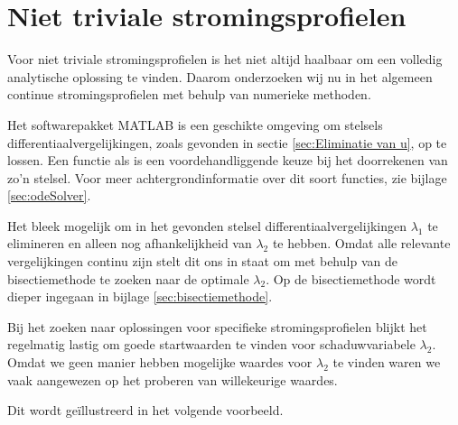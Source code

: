 \chapter{Niet triviale stromingsprofielen}\label{sec:numeriekeMethoden}
Voor niet triviale stromingsprofielen is het niet altijd haalbaar om een volledig analytische oplossing te vinden. Daarom onderzoeken wij nu in het algemeen continue stromingsprofielen met behulp van numerieke methoden.

Het softwarepakket MATLAB is een geschikte omgeving om stelsels differentiaalvergelijkingen, zoals gevonden in sectie \ref{sec:Eliminatie van u}, op te lossen. Een functie als  is een voordehandliggende keuze bij het doorrekenen van zo'n stelsel. Voor meer achtergrondinformatie over dit soort functies, zie bijlage \ref{sec:odeSolver}.

Het bleek mogelijk om in het gevonden stelsel differentiaalvergelijkingen \(\lambda_1\) te elimineren en alleen nog afhankelijkheid van \(\lambda_2\) te hebben. Omdat alle relevante vergelijkingen continu zijn stelt dit ons in staat om met behulp van de bisectiemethode te zoeken naar de optimale \(\lambda_2\). Op de bisectiemethode wordt dieper ingegaan in bijlage \ref{sec:bisectiemethode}.

Bij het zoeken naar oplossingen voor specifieke stromingsprofielen blijkt het regelmatig lastig om goede startwaarden te vinden voor schaduwvariabele \(\lambda_2\). Omdat we geen manier hebben mogelijke waardes voor \(\lambda_2\) te vinden waren we vaak aangewezen op het proberen van willekeurige waardes.


Dit wordt ge\"illustreerd in het volgende voorbeeld.

